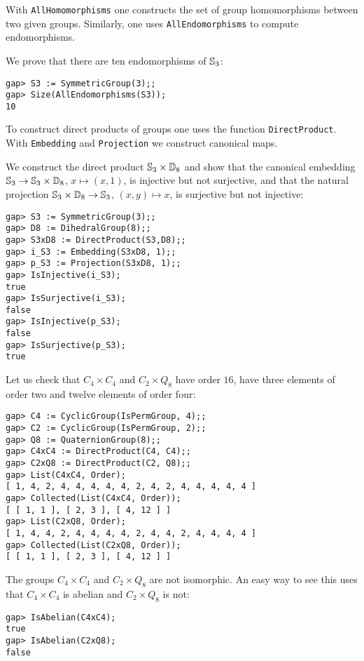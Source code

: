 With \lstinline{AllHomomorphisms} one constructs the set of group homomorphisms
between two given groups.  Similarly, one uses \lstinline{AllEndomorphisms} to
compute endomorphisms.

\begin{example}
We prove that there are ten endomorphisms of $\mathbb{S}_3$:
\begin{lstlisting}
gap> S3 := SymmetricGroup(3);;
gap> Size(AllEndomorphisms(S3));
10
\end{lstlisting}
\end{example}

To construct direct products of groups one uses the function
\lstinline{DirectProduct}. With \lstinline{Embedding} and
\lstinline{Projection} we construct canonical maps. 

\begin{example}
We construct the direct product $\mathbb{S}_3\times\mathbb{D}_8$ 
and show that the canonical embedding $\mathbb{S}_3\to\mathbb{S}_3\times\mathbb{D}_8$, $x\mapsto (x,1)$,  
is injective but not surjective, and that the natural projection  
$\mathbb{S}_3\times\mathbb{D}_8\to\mathbb{S}_3$, $(x,y)\mapsto x$, is surjective but not injective:
\begin{lstlisting}
gap> S3 := SymmetricGroup(3);;
gap> D8 := DihedralGroup(8);;
gap> S3xD8 := DirectProduct(S3,D8);;
gap> i_S3 := Embedding(S3xD8, 1);;
gap> p_S3 := Projection(S3xD8, 1);;
gap> IsInjective(i_S3);
true
gap> IsSurjective(i_S3);
false
gap> IsInjective(p_S3);
false
gap> IsSurjective(p_S3);
true
\end{lstlisting}
\end{example}

\begin{example}
Let us check that $C_4\times C_4$ and 
$C_2\times Q_8$ have order $16$, have three elements of order two and twelve elements of order four:
\begin{lstlisting}
gap> C4 := CyclicGroup(IsPermGroup, 4);;
gap> C2 := CyclicGroup(IsPermGroup, 2);;
gap> Q8 := QuaternionGroup(8);;
gap> C4xC4 := DirectProduct(C4, C4);;
gap> C2xQ8 := DirectProduct(C2, Q8);;
gap> List(C4xC4, Order);
[ 1, 4, 2, 4, 4, 4, 4, 4, 2, 4, 2, 4, 4, 4, 4, 4 ]
gap> Collected(List(C4xC4, Order));
[ [ 1, 1 ], [ 2, 3 ], [ 4, 12 ] ]
gap> List(C2xQ8, Order);
[ 1, 4, 4, 2, 4, 4, 4, 4, 2, 4, 4, 2, 4, 4, 4, 4 ]
gap> Collected(List(C2xQ8, Order));
[ [ 1, 1 ], [ 2, 3 ], [ 4, 12 ] ]
\end{lstlisting}
The groups
$C_4\times C_4$ and 
$C_2\times Q_8$ are not isomorphic. 
An easy way to see this uses that 
$C_4\times C_4$ is abelian and $C_2\times Q_8$ is not:
\begin{lstlisting}
gap> IsAbelian(C4xC4);
true
gap> IsAbelian(C2xQ8);
false
\end{lstlisting}
\end{example}


